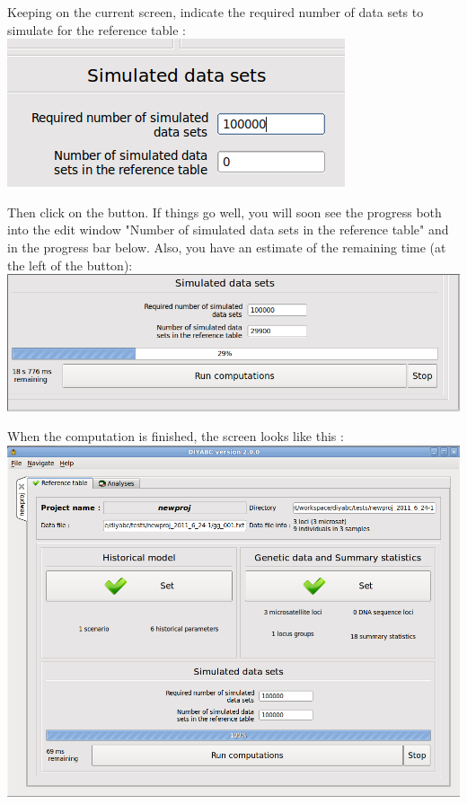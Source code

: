 Keeping on the current screen, indicate the required number of data sets to simulate for the reference table : \\ 

\includegraphics[scale=0.35]{gui_pictures/Capture-DIYABC-24.png} 


Then click on the  button. If things go well, you will soon see the progress both into the edit window "Number of simulated data sets in the reference table" and in the progress bar below. Also, you have an estimate of the remaining time (at the left of the   button):\\

\includegraphics[scale=0.35]{gui_pictures/Capture-DIYABC-25.png} 

When the computation is finished, the screen looks like this :\\

\includegraphics[scale=0.35]{gui_pictures/Capture-DIYABC-26.png} 


